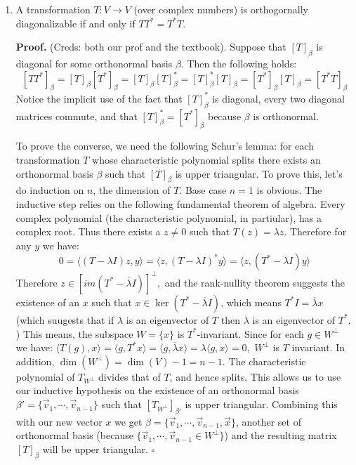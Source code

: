\documentclass[11pt]{article}
\newcommand{\ol}{\overline}
\newcommand{\inner}[2]{\langle #1, #2\rangle}
\begin{document}
\begin{enumerate}
\item A transformation $T:V\to V$ (over complex numbers) is orthogornally diagonalizable if and only if $TT^*=T^*T.$

\textbf{Proof.} (Creds: both our prof and the textbook). Suppose that $[T]_\beta$ is diagonal for some orthonormal basis $\beta.$ 
Then the following holds: 
\[ [TT^*]_\beta=[T]_\beta[T^*]_\beta=[T]_\beta[T]^*_\beta=[T]^*_\beta[T]_\beta=[T^*]_\beta[T]_\beta= [T^*T]_\beta\]
Notice the implicit use of the fact that $[T]^*_\beta$ is diagonal, every two diagonal matrices commute, and that $[T]^*_\beta=[T^*]_\beta$ because $\beta$ is orthonormal. 

To prove the converse, we need the following Schur's lemma: 
for each transformation $T$ whose characteristic polynomial splits there exists an orthonormal basis $\beta$ such that $[T]_\beta$ is upper triangular. 
To prove this, let's do induction on $n$, the dimension of $T$. Base case $n=1$ is obvious. 
The inductive step relies on the following fundamental theorem of algebra. Every complex polynomial (the characteristic polynomial, in partiular), has a complex root. Thus there exists a $z\neq 0$ such that $T(z)=\lambda z$. 
Therefore for any $y$ we have: 
\[0=\inner{(T-\lambda I)z}{y}=\inner{z}{(T-\lambda I)^*y}
=\inner{z}{(T^*-\ol{\lambda} I)y}
\]
Therefore $z\in [im(T^*-\ol{\lambda} I)]^{\perp},$ and the rank-nullity theorem suggests the existence of an $x$ such that 
$x\in\ker(T^*-\ol{\lambda} I)$, which means $T^*I=\ol{\lambda}x$ (which suugests that if $\lambda$ is an eigenvector of $T$ then $\ol{\lambda}$ is an eigenvector of $T^*$. )
This means, the subspace $W=\{x\}$ is $T^*$-invariant. Since for each $g\in W^{\perp}$ we have:
$\inner{T(g)}{x}=\inner{g}{T^*x}=\inner{g}{\ol{\lambda}x}=\lambda\inner{g}{x}=0,$ $W^{\perp}$ is $T$ invariant. 
In addition, $\dim(W^{\perp})=\dim(V)-1=n-1$. 
The characteristic polynomial of $T_{W^{\perp}}$ divides that of $T$, and hence splits. 
This allows us to use our inductive hypothesis on the existence of an orthonormal basis $\beta'=\{\vec{v}_1, \cdots , \vec{v}_{n-1}\}$ such that $[T_{W^{\perp}}]_{\beta'}$ is upper triangular. 
Combining this with our new vector $x$ we get $\beta=\{\vec{v}_1, \cdots , \vec{v}_{n-1}, \vec{x}\}$, another set of orthonormal basis (because $\{\vec{v}_1, \cdots , \vec{v}_{n-1}\in W^{\perp}\}$) and the resulting matrix $[T]_\beta$ will be upper triangular. 
$\square$


\end{enumerate}
\end{document}
